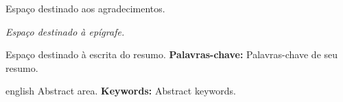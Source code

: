 \documentclass[
	12pt,				%
	openright,			%
	oneside,			%
	a4paper,			%
	
	
	english,			%
	french,				%
	spanish,			%
	brazil				%
]{abntex2}
\begin{document}
\begin{agradecimentos}
Espaço destinado aos agradecimentos.
\end{agradecimentos}

\begin{epigrafe}
    \vspace*{\fill}
	\begin{flushright}
		\textit{Espaço destinado à epígrafe.}
	\end{flushright}
\end{epigrafe}



\setlength{\absparsep}{18pt} %
\begin{resumo}
Espaço destinado à escrita do resumo.
\textbf{Palavras-chave:} Palavras-chave de seu resumo.
\end{resumo}

\begin{resumo}[Abstract]
 \begin{otherlanguage*}{english}
Abstract area.
\textbf{Keywords:} Abstract keywords.
 \end{otherlanguage*}
\end{resumo}



\listoffigures*
\cleardoublepage



\listoftables*
\cleardoublepage





\tableofcontents*
\cleardoublepage



\pagestyle{simple}



\end{document}
